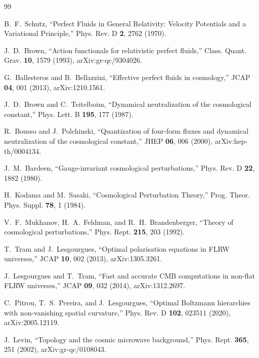 \documentclass[
  aps,
  prd,
  reprint,
  superscriptaddress,
  floatfix,
  nofootinbib,
  longbibliography
]{revtex4-2}
\theoremstyle{plain}
\theoremstyle{definition}
\theoremstyle{remark}
\begin{document}
\begin{sloppypar}
\begin{thebibliography}{99}
\raggedright

B.~F.~Schutz,
``Perfect Fluids in General Relativity: Velocity Potentials and a Variational Principle,''
Phys. Rev. D \textbf{2}, 2762 (1970).

J.~D.~Brown,
``Action functionals for relativistic perfect fluids,''
Class. Quant. Grav. \textbf{10}, 1579 (1993),
arXiv:gr-qc/9304026.

G.~Ballesteros and B.~Bellazzini,
``Effective perfect fluids in cosmology,''
JCAP \textbf{04}, 001 (2013),
arXiv:1210.1561.

J.~D.~Brown and C.~Teitelboim,
``Dynamical neutralization of the cosmological constant,''
Phys. Lett. B \textbf{195}, 177 (1987).

R.~Bousso and J.~Polchinski,
``Quantization of four-form fluxes and dynamical neutralization of the cosmological constant,''
JHEP \textbf{06}, 006 (2000),
arXiv:hep-th/0004134.

J.~M.~Bardeen,
``Gauge-invariant cosmological perturbations,''
Phys. Rev. D \textbf{22}, 1882 (1980).

H.~Kodama and M.~Sasaki,
``Cosmological Perturbation Theory,''
Prog. Theor. Phys. Suppl. \textbf{78}, 1 (1984).

V.~F.~Mukhanov, H.~A.~Feldman, and R.~H.~Brandenberger,
``Theory of cosmological perturbations,''
Phys. Rept. \textbf{215}, 203 (1992).

T.~Tram and J.~Lesgourgues,
``Optimal polarisation equations in FLRW universes,''
JCAP \textbf{10}, 002 (2013),
arXiv:1305.3261.

J.~Lesgourgues and T.~Tram,
``Fast and accurate CMB computations in non-flat FLRW universes,''
JCAP \textbf{09}, 032 (2014),
arXiv:1312.2697.

C.~Pitrou, T.~S.~Pereira, and J.~Lesgourgues,
``Optimal Boltzmann hierarchies with non-vanishing spatial curvature,''
Phys. Rev. D \textbf{102}, 023511 (2020),
arXiv:2005.12119.

J.~Levin,
``Topology and the cosmic microwave background,''
Phys. Rept. \textbf{365}, 251 (2002),
arXiv:gr-qc/0108043.


\end{thebibliography}
\end{sloppypar}
\end{document}
